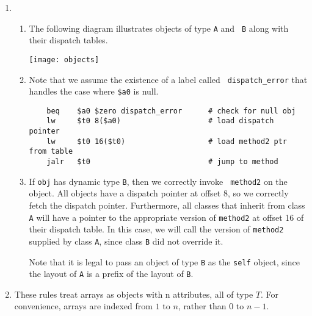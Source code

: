 \documentclass{article}
\begin{document}

\begin{enumerate}

\item

\begin{enumerate}

\item The following diagram illustrates objects of type {\tt A} and {\tt
B} along with their dispatch tables.

\begin{center}
\texttt{[image: objects]}
\end{center}

\item Note that we assume the existence of a label called {\tt
dispatch\_error} that handles the case where {\tt \$a0} is null.

\begin{verbatim}
    beq    $a0 $zero dispatch_error      # check for null obj
    lw     $t0 8($a0)                    # load dispatch pointer
    lw     $t0 16($t0)                   # load method2 ptr from table
    jalr   $t0                           # jump to method
\end{verbatim}

\item

If {\tt obj} has dynamic type {\tt B}, then we correctly invoke {\tt
method2} on the object.  All objects have a dispatch pointer at offset 8,
so we correctly fetch the dispatch pointer.  Furthermore, all classes that
inherit from class {\tt A} will have a pointer to the appropriate version
of {\tt method2} at offset 16 of their dispatch table.  In this case, we
will call the version of {\tt method2} supplied by class {\tt A}, since
class {\tt B} did not override it.

Note that it is legal to pass an object of type {\tt B} as the {\tt self}
object, since the layout of {\tt A} is a prefix of the layout of {\tt B}.

\end{enumerate}

\item 

These rules treat arrays as objects with n attributes, all of type $T$.
For convenience, arrays are indexed from $1$ to $n$, rather than $0$ to
$n-1$. 


\end{enumerate}
\end{document}
